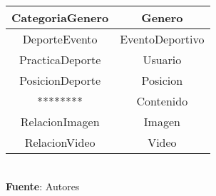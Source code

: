 \begin{table}[!htb]
\begin{center}
{\begin{tabular}{|p{4cm}|p{4cm}|p{4cm}|p{4cm}|}
			\multicolumn{2}{|c|}{CategoriaGenero} & 
			\multicolumn{2}{c|}{Genero} \\
			\hline
			\multicolumn{2}{|c|}{DeporteEvento} & 
			\multicolumn{2}{c|}{EventoDeportivo} \\
			\hline
			\multicolumn{2}{|c|}{PracticaDeporte} & 
			\multicolumn{2}{c|}{Usuario} \\
			\hline
			\multicolumn{2}{|c|}{PosicionDeporte} & 
			\multicolumn{2}{c|}{Posicion} \\
			\hline
			\multicolumn{2}{|c|}{********} & 
			\multicolumn{2}{c|}{Contenido} \\
			\hline
			\multicolumn{2}{|c|}{RelacionImagen} & 
			\multicolumn{2}{c|}{Imagen} \\
			\hline
			\multicolumn{2}{|c|}{RelacionVideo} & 
			\multicolumn{2}{c|}{Video} \\
			\hline
		\end{tabular}
		} \\
		\textbf{Fuente}: Autores
	\end{center}
\end{table}